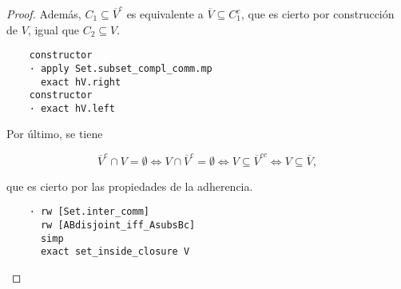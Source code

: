 \begin{proof}
  Además, $C_1 \subseteq \overline{V}^c$ es equivalente a $\overline{V} \subseteq C_1^c$, que es cierto por construcción de $V$, igual que $C_2 \subseteq V$.
  
\begin{lstlisting}
    constructor
    · apply Set.subset_compl_comm.mp
      exact hV.right
    constructor
    · exact hV.left
\end{lstlisting}

  Por último, se tiene

  $$
  \overline{V}^c \cap V = \emptyset \iff V \cap \overline{V}^c = \emptyset \iff
  V \subseteq \overline{V}^{cc} \iff V \subseteq \overline{V},
  $$

  que es cierto por las propiedades de la adherencia.

\begin{lstlisting}
    · rw [Set.inter_comm]
      rw [ABdisjoint_iff_AsubsBc]
      simp
      exact set_inside_closure V
\end{lstlisting}


\end{proof}